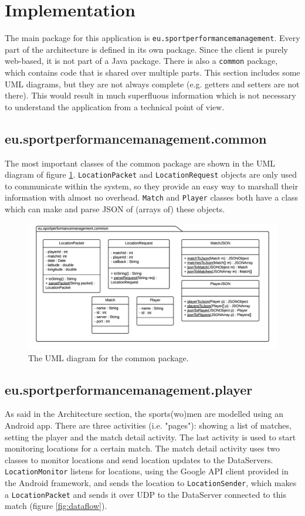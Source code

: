 \section{Implementation}
The main package for this application is \texttt{eu.sportperformancemanagement}. Every part of the architecture is defined in its own package. Since the client is purely web-based, it is not part of a Java package. There is also a \texttt{common} package, which contains code that is shared over multiple parts. This section includes some UML diagrams, but they are not always complete (e.g. getters and setters are not there). This would result in much superfluous information which is not necessary to understand the application from a technical point of view.

\subsection{eu.sportperformancemanagement.common}
The most important classes of the common package are shown in the UML diagram of figure \ref{fig:uml_common}. \texttt{LocationPacket} and \texttt{LocationRequest} objects are only used to communicate within the system, so they provide an easy way to marshall their information with almost no overhead. \texttt{Match} and \texttt{Player} classes both have a class which can make and parse JSON of (arrays of) these objects. 

\begin{figure}
\centering
\includegraphics[width=\textwidth]{img/uml_common.png}
\caption{The UML diagram for the common package.}
\label{fig:uml_common}
\end{figure}

\subsection{eu.sportperformancemanagement.player}
As said in the Architecture section, the sports(wo)men are modelled using an Android app. There are three activities (i.e. "pages"): showing a list of matches, setting the player and the match detail activity. The last activity is used to start monitoring locations for a certain match. The match detail activity uses two classes to monitor locations and send location updates to the DataServers. \texttt{LocationMonitor} listens for locations, using the Google API client provided in the Android framework, and sends the location to \texttt{LocationSender}, which makes a \texttt{LocationPacket} and sends it over UDP to the DataServer connected to this match (figure \ref{fig:dataflow}).

